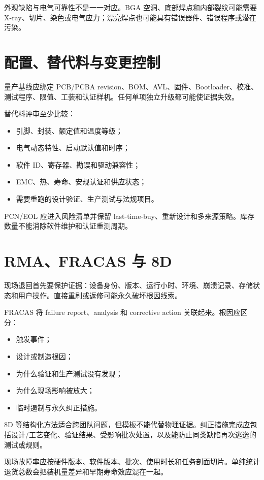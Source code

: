 外观缺陷与电气可靠性不是一一对应。BGA 空洞、底部焊点和内部裂纹可能需要 X-ray、切片、染色或电气应力；漂亮焊点也可能具有错误器件、错误程序或潜在污染。

\section{配置、替代料与变更控制}

量产基线应绑定 PCB/PCBA revision、BOM、AVL、固件、Bootloader、校准、测试程序、限值、工装和认证样机。任何单项独立升级都可能使证据失效。

替代料评审至少比较：
\begin{itemize}
  \item 引脚、封装、额定值和温度等级；
  \item 电气动态特性、启动默认值和时序；
  \item 软件 ID、寄存器、勘误和驱动兼容性；
  \item EMC、热、寿命、安规认证和供应状态；
  \item 需要重跑的设计验证、生产测试与法规项目。
\end{itemize}

PCN/EOL 应进入风险清单并保留 last-time-buy、重新设计和多来源策略。库存数量不能消除软件维护和认证重测周期。

\section{RMA、FRACAS 与 8D}

现场退回首先要保护证据：设备身份、版本、运行小时、环境、崩溃记录、存储状态和用户操作。直接重刷或返修可能永久破坏根因线索。

FRACAS 将 failure report、analysis 和 corrective action 关联起来。根因应区分：
\begin{itemize}
  \item 触发事件；
  \item 设计或制造根因；
  \item 为什么验证和生产测试没有发现；
  \item 为什么现场影响被放大；
  \item 临时遏制与永久纠正措施。
\end{itemize}

8D 等结构化方法适合跨团队问题，但模板不能代替物理证据。纠正措施完成应包括设计/工艺变化、验证结果、受影响批次处置，以及能防止同类缺陷再次逃逸的测试或规则。

现场故障率应按硬件版本、软件版本、批次、使用时长和任务剖面切片。单纯统计退货总数会把装机量差异和早期寿命效应混在一起。

